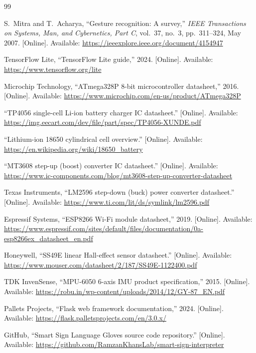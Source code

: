 \documentclass[12pt,a4paper]{report}
\begin{document}
\begin{thebibliography}{99}

S.~Mitra and T.~Acharya,
``Gesture recognition: A survey,''
\textit{IEEE Transactions on Systems, Man, and Cybernetics, Part C},
vol.~37, no.~3, pp.~311--324, May 2007.
[Online]. Available: \url{https://ieeexplore.ieee.org/document/4154947}

TensorFlow Lite,
``TensorFlow Lite guide,'' 2024.
[Online]. Available: \url{https://www.tensorflow.org/lite}

Microchip Technology,
``ATmega328P 8-bit microcontroller datasheet,'' 2016.
[Online]. Available: \url{https://www.microchip.com/en-us/product/ATmega328P}

``TP4056 single-cell Li-ion battery charger IC datasheet.''
[Online]. Available: \url{https://img.eecart.com/dev/file/part/spec/TP4056-XUNDE.pdf}

``Lithium-ion 18650 cylindrical cell overview.''
[Online]. Available: \url{https://en.wikipedia.org/wiki/18650_battery}

``MT3608 step-up (boost) converter IC datasheet.''
[Online]. Available: \url{https://www.ic-components.com/blog/mt3608-step-up-converter-datasheet}

Texas Instruments,
``LM2596 step-down (buck) power converter datasheet.''
[Online]. Available: \url{https://www.ti.com/lit/ds/symlink/lm2596.pdf}

Espressif Systems,
``ESP8266 Wi-Fi module datasheet,'' 2019.
[Online]. Available: \url{https://www.espressif.com/sites/default/files/documentation/0a-esp8266ex_datasheet_en.pdf}

Honeywell,
``SS49E linear Hall-effect sensor datasheet.''
[Online]. Available: \url{https://www.mouser.com/datasheet/2/187/SS49E-1122400.pdf}

TDK InvenSense,
``MPU-6050 6-axis IMU product specification,'' 2015.
[Online]. Available: \url{https://robu.in/wp-content/uploads/2014/12/GY-87_EN.pdf}

Pallets Projects,
``Flask web framework documentation,'' 2024.
[Online]. Available: \url{https://flask.palletsprojects.com/en/3.0.x/}

GitHub,
``Smart Sign Language Gloves source code repository.''  
[Online]. Available: \url{https://github.com/RamzanKhansLab/smart-sign-interpreter}

\end{thebibliography}
\end{document}
